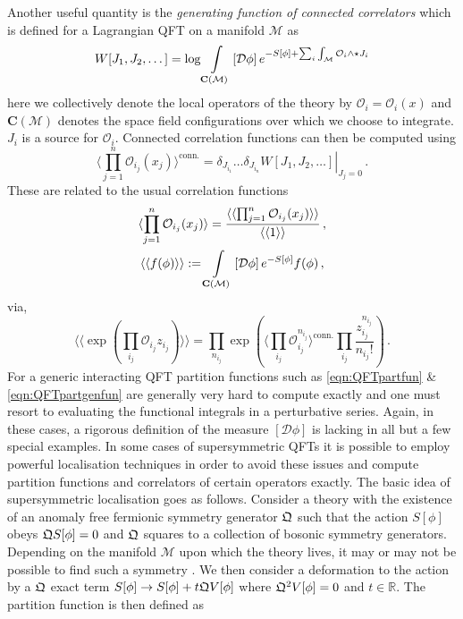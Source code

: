 \documentclass[main.tex]{subfiles}
\begin{document}
Another useful quantity is the \textit{generating function of connected correlators} which is defined for a Lagrangian QFT on a manifold $\mathcal{M}$ as 
\begin{equation}\label{eqn:QFTpartgenfun}
W[J_1,J_2,\dots]=\log\int\displaylimits_{\mathbf{C}(\mathcal{M})}\left[\mathcal{D}\phi\right]e^{-S[\phi]+\sum_i\int_{\mathcal{M}}\mathcal{O}_i\wedge\star J_i}
\end{equation}
here we collectively denote the local operators of the theory by $\mathcal{O}_i=\mathcal{O}_i(x)$ and $\mathbf{C}(\mathcal{M})$ denotes the space field configurations over which we choose to integrate. $J_i$ is a source for $\mathcal{O}_i$. Connected correlation functions can then be computed using
\begin{equation}
\langle\prod_{j=1}^n\mathcal{O}_{i_j}(x_j)\rangle^{\text{conn.}}=\left.\delta_{J_{i_1}}\dots\delta_{J_{i_n}}W[J_1,J_2,\dots]\right|_{J_j=0}\,.
\end{equation}
These are related to the usual correlation functions
\begin{gather}
\langle\prod_{j=1}^n\mathcal{O}_{i_j}(x_j)\rangle=\frac{\langle\langle\prod_{j=1}^n\mathcal{O}_{i_j}(x_j)\rangle\rangle}{\langle\langle1\rangle\rangle}\,,\\ \langle\langle f(\phi)\rangle\rangle:=\int\displaylimits_{\mathbf{C}(\mathcal{M})}\left[\mathcal{D}\phi\right]e^{-S[\phi]}f(\phi)\,,
\end{gather}
via,
\begin{equation}
\langle\langle \exp\left(\prod_{i_j}\mathcal{O}_{i_j}z_{i_j}\right)\rangle\rangle=\prod_{n_{i_j}}\exp \left(\langle\prod_{i_j}\mathcal{O}^{n_{i_j}}_{i_j}\rangle^{\text{conn.}}\prod_{i_j}\frac{z_{i_j}^{n_{i_j}}}{n_{i_j}!}\right)\,.
\end{equation}
For a generic interacting QFT partition functions such as \eqref{eqn:QFTpartfun} \& \eqref{eqn:QFTpartgenfun} are generally very hard to compute exactly and one must resort to evaluating the functional integrals in a perturbative series.  Again, in these cases, a rigorous definition of the measure $\left[\mathcal{D}\phi\right]$ is lacking in all but a few special examples.  
In some cases of supersymmetric QFTs it is possible to employ powerful localisation techniques \cite{Duistermaat:1982vw,atiyah1988moment} in order to avoid these issues and compute partition functions and correlators of certain operators exactly.  The basic idea of supersymmetric localisation goes as follows.  Consider a theory with the existence of an anomaly free fermionic symmetry generator $\mathfrak{Q}$ such that the action $S[\phi]$ obeys $\mathfrak{Q} S[\phi]=0$ and $\mathfrak{Q}$ squares to a collection of bosonic symmetry generators.  Depending on the manifold $\mathcal{M}$ upon which the theory lives, it may or may not be possible to find such a symmetry \cite{Festuccia2011}.  We then consider a deformation to the action by a $\mathfrak{Q}$ exact term $S[\phi]\to S[\phi]+t\mathfrak{Q} V[\phi]$ where $\mathfrak{Q}^2V[\phi]=0$ and $t\in\mathbb{R}$.  The partition function is then defined as
\end{document}
